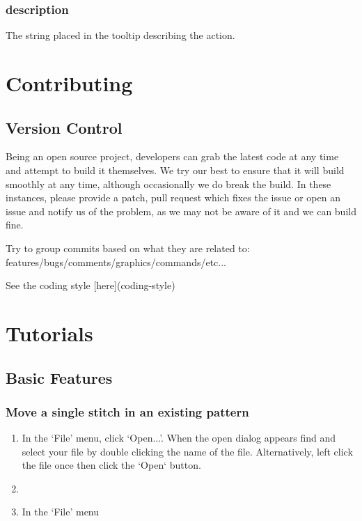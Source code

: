 \documentclass{report}
\begin{document}
\subsection{description}

The string placed in the tooltip describing the action.

\chapter{Contributing}

\section{Version Control}

Being an open source project, developers can grab the latest code at any time
and attempt to build it themselves. We try our best to ensure that it will build smoothly
at any time, although occasionally we do break the build. In these instances,
please provide a patch, pull request which fixes the issue or open an issue and
notify us of the problem, as we may not be aware of it and we can build fine.

Try to group commits based on what they are related to: features/bugs/comments/graphics/commands/etc...

See the coding style [here](coding-style)

\chapter{Tutorials}

\section{Basic Features}

\subsection{Move a single stitch in an existing pattern}

\begin{enumerate}
\item In the `File' menu, click `Open...'. When the open dialog appears find
  and select your file by double clicking the name of the file. Alternatively,
  left click the file once then click the `Open` button.
\item
\item In the `File' menu
\end{enumerate}
\end{document}
